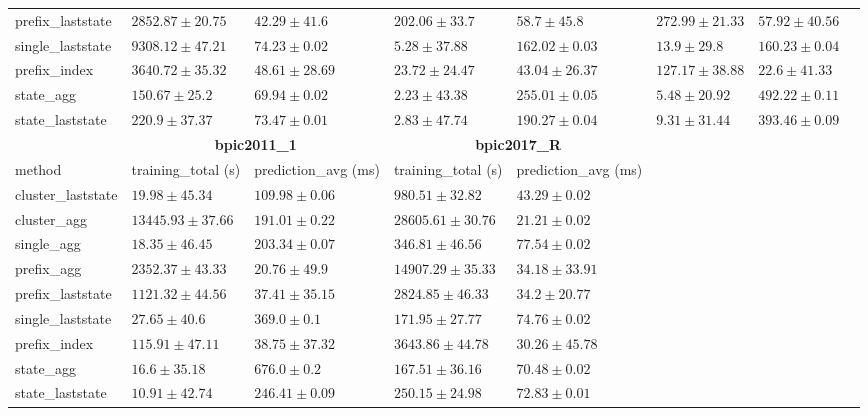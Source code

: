 \documentclass[twoside,11pt]{Latex/Classes/PhDthesisPSnPDF}
\begin{document}
\begin{table}[h]
{\begin{tabular}{llllllll}
				prefix\_laststate & $2852.87 \pm 20.75$ & $42.29 \pm 41.6$ & $202.06 \pm 33.7$ & $58.7 \pm 45.8$ & $272.99 \pm 21.33$ & $57.92 \pm 40.56$ \\ 
				single\_laststate & $9308.12 \pm 47.21$ & $74.23 \pm 0.02$ & $5.28 \pm 37.88$ & $162.02 \pm 0.03$ & $13.9 \pm 29.8$ & $160.23 \pm 0.04$ \\ 
				prefix\_index & $3640.72 \pm 35.32$ & $48.61 \pm 28.69$ & $23.72 \pm 24.47$ & $43.04 \pm 26.37$ & $127.17 \pm 38.88$ & $\mathbf{22.6 \pm 41.33}$ \\ 
				state\_agg & $\mathbf{150.67 \pm 25.2}$ & $69.94 \pm 0.02$ & $\mathbf{2.23 \pm 43.38}$ & $255.01 \pm 0.05$ & $\mathbf{5.48 \pm 20.92}$ & $492.22 \pm 0.11$ \\ 
				state\_laststate & $220.9 \pm 37.37$ & $73.47 \pm 0.01$ & $2.83 \pm 47.74$ & $190.27 \pm 0.04$ & $9.31 \pm 31.44$ & $393.46 \pm 0.09$ \\ 
				\bottomrule
				\toprule
				& \multicolumn{2}{c}{{\bfseries bpic2011\_1}} & \multicolumn{2}{c}{{\bfseries bpic2017\_R}} \\ \cmidrule(lr){2-3} \cmidrule(lr){4-5} \cmidrule(lr){6-7}
				method  & training\_total (s) & prediction\_avg (ms) & training\_total (s) & prediction\_avg (ms) \\ \midrule
				cluster\_laststate & $19.98 \pm 45.34$ & $109.98 \pm 0.06$ & $980.51 \pm 32.82$ & $43.29 \pm 0.02$ \\ 
				cluster\_agg & $13445.93 \pm 37.66$ & $191.01 \pm 0.22$ & $28605.61 \pm 30.76$ & $\mathbf{21.21 \pm 0.02}$ \\ 
				single\_agg & $18.35 \pm 46.45$ & $203.34 \pm 0.07$ & $346.81 \pm 46.56$ & $77.54 \pm 0.02$ \\ 
				prefix\_agg & $2352.37 \pm 43.33$ & $\mathbf{20.76 \pm 49.9}$ & $14907.29 \pm 35.33$ & $34.18 \pm 33.91$ \\ 
				prefix\_laststate & $1121.32 \pm 44.56$ & $37.41 \pm 35.15$ & $2824.85 \pm 46.33$ & $34.2 \pm 20.77$ \\ 
				single\_laststate & $27.65 \pm 40.6$ & $369.0 \pm 0.1$ & $171.95 \pm 27.77$ & $74.76 \pm 0.02$ \\ 
				prefix\_index & $115.91 \pm 47.11$ & $38.75 \pm 37.32$ & $3643.86 \pm 44.78$ & $30.26 \pm 45.78$ \\ 
				state\_agg & $16.6 \pm 35.18$ & $676.0 \pm 0.2$ & $\mathbf{167.51 \pm 36.16}$ & $70.48 \pm 0.02$ \\ 
				state\_laststate & $\mathbf{10.91 \pm 42.74}$ & $246.41 \pm 0.09$ & $250.15 \pm 24.98$ & $72.83 \pm 0.01$ \\ 
				\bottomrule
				
		\end{tabular}%
	}
\end{table}
\end{document}
